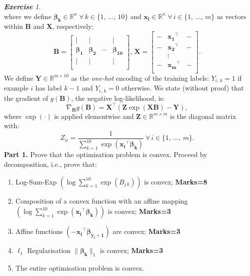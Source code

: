 \documentclass[12pt]{article}
\numberwithin{equation}{section}
\theoremstyle{remark}
\newtheorem{exercise}{\bf Exercise}
\newcommand{\R}{\mathbb R} %
\newcommand{\vect}[1]{\boldsymbol{#1}}
\newcommand{\norm}[2]{\|#1\|_{#2}}
\begin{document}
\begin{exercise}
\[\]
%
where we define $\vect{\beta_k} \in \R^n \; \forall \, k \in \{ 1, \, \ldots, \, 10 \}$ and $\vect{x_i} \in \R^n \; \forall \, i \in \{1, \, \ldots, \, m \}$ as vectors within $\vect{B}$ and $\vect{X}$, respectively:
%
\[
\vect{B} = 
\left[ \begin{array}{cccc} 
%
| & | & & | \\
\vect{\beta_1} & \vect{\beta_2} & \cdots & \vect{\beta_{10}} \\
| & | & & | \\
%
\end{array}
\right], \,
%
\vect{X} = 
\left[ \begin{array}{ccc} 
- & \vect{x_1}^{\top} & - \\
- & \vect{x_2}^{\top} & - \\
& \vdots \\
- & \vect{x_m}^{\top} & - \\
\end{array}
\right].
%
\]
%
We define $\vect{Y} \in \R^{m \times 10}$ as the \emph{one-hot} encoding of the training labels: $Y_{i, \, k} = 1$ if example $i$ has label $k - 1$ and $Y_{i, \, k} = 0$ otherwise. We state (without proof) that the gradient of $g(\vect{B})$, the negative log-likelihood, is:
%
\[
\nabla_{\vect{B}} g(\vect{B}) = \vect{X}^{\top} \left( \vect{Z} \exp \left( \vect{X} \vect{B} \right) - \vect{Y} \right),
\]
%
where $\exp(\cdot)$ is applied elementwise and $\vect{Z} \in \R^{m \times m}$ is the diagonal matrix with:
%
\[
Z_{ii} = \frac{1}{\sum_{k = 1}^{10} \exp \left( \vect{x_i}^{\top} \vect{\beta_k} \right)} \ \forall \, i \in \{1, \, \ldots, \, m \}.
\]
%
{\bf Part 1.} Prove that the optimisation problem is convex. Proceed by decomposition, i.e., prove that:
%
\begin{enumerate}
%
\item Log-Sum-Exp $\left( \log \sum\limits_{k = 1}^{10} \exp \left( B_{j \, k} \right) \right)$ is convex;
\phantom{hi} \hfill {\bf Marks=8} 
%
\item Composition of a convex function with an affine mapping $\left( \log \sum\limits_{k = 1}^{10} \exp \left( \vect{x_i}^{\top} \vect{\beta_k} \right) \right)$ is convex;
\phantom{hi} \hfill {\bf Marks=3} 
%
\item Affine functions $\left( - \vect{x_i}^{\top} \vect{\beta_{y_i + 1}} \right)$ are convex;
\phantom{hi} \hfill {\bf Marks=3} 
%
\item $\ell_1$ Regularisation $\norm{\vect{\beta_k}}{1}$ is convex;
\phantom{hi} \hfill {\bf Marks=3} 
%
\item The entire optimisation problem is convex. 

\end{enumerate}
\end{exercise}
\end{document}
